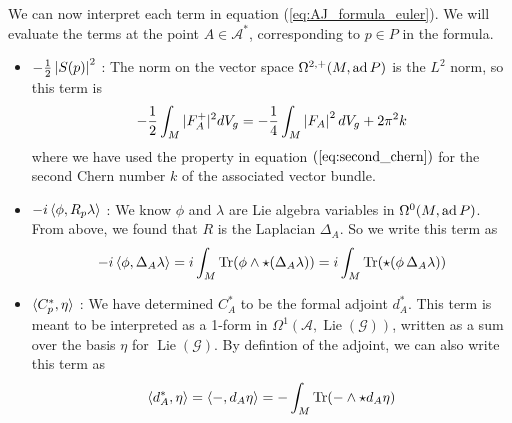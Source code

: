 We can now interpret each term in equation (\ref{eq:AJ_formula_euler}).
We will evaluate the terms at the point $A\in \mathcal{A}^*$, corresponding to
$p\in P$ in the formula.
\begin{itemize}[leftmargin=\parindent]
	\setlength\itemsep{0.5ex}
    \item 
$-\frac{1}{2}\abs{S(p)}^2$ : 
The norm on the vector space $\Omega^{2,+}(M,\operatorname{ad} P)$ is the 
$L^2$ norm, so this term is 
\[
-\frac{1}{2}\int_M \abs[*]{F^+_A}^2 dV_g 
= -\frac{1}{4}\int_M \abs{F_A}^2 dV_g + 2\pi^2k
\] 
where we have used the property in equation $(\ref{eq:second_chern})$ for the 
second Chern number $k$ of the associated vector bundle.

	\item 
$-i\gen{\phi,R_p\lambda}$ : We know $\phi$ and  $\lambda$ are Lie algebra
variables in  $\Omega^0(M,\operatorname{ad} P)$. From above, we found that  $R$ is the
Laplacian $\Delta_A$. So we write this term as  
\[
-i\gen{\phi,\Delta_A\lambda} 
= i \int_M \Tr (\phi \wedge \star (\Delta_A\lambda))
= i \int_M \Tr (\star (\phi\,\Delta_A\lambda))
\] 

	\item 
$\gen[*]{C_p^*,\eta}$ : We have determined $C_A^*$ to be the formal adjoint $d_A^*$. 
This term is meant to be interpreted as a 1-form in
$\Omega^1(\mathcal{A},\operatorname{Lie}(\mathcal{G}))$, written as a sum over
the basis $\eta$ for $\operatorname{Lie}(\mathcal{G})$. By defintion of the
adjoint, we can also write this term as 
\[
\gen{d_A^*,\eta}=\gen{-,d_A\eta} = -\int_M \Tr(- \wedge \star d_A\eta)
\] 


\end{itemize}
